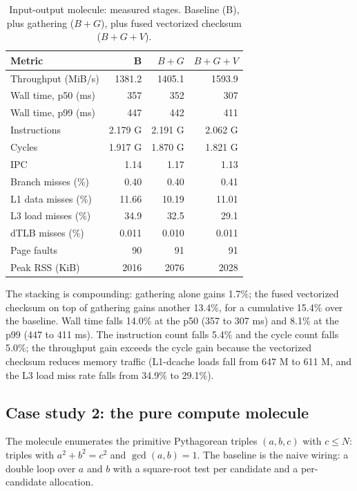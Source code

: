 \begin{table}[t]
\centering
\caption{Input-output molecule: measured stages. Baseline (B), plus
gathering ($B+G$), plus fused vectorized checksum ($B+G+V$).}
\label{tab:demo1}
\begin{tabular}{lrrr}
\toprule
Metric & B & $B+G$ & $B+G+V$\\
\midrule
Throughput (MiB/s) & 1381.2 & 1405.1 & 1593.9\\
Wall time, p50 (ms) & 357 & 352 & 307\\
Wall time, p99 (ms) & 447 & 442 & 411\\
Instructions & 2.179 G & 2.191 G & 2.062 G\\
Cycles & 1.917 G & 1.870 G & 1.821 G\\
IPC & 1.14 & 1.17 & 1.13\\
Branch misses (\%) & 0.40 & 0.40 & 0.41\\
L1 data misses (\%) & 11.66 & 10.19 & 11.01\\
L3 load misses (\%) & 34.9 & 32.5 & 29.1\\
dTLB misses (\%) & 0.011 & 0.010 & 0.011\\
Page faults & 90 & 91 & 91\\
Peak RSS (KiB) & 2016 & 2076 & 2028\\
\bottomrule
\end{tabular}
\end{table}

The stacking is compounding: gathering alone gains 1.7\%; the fused
vectorized checksum on top of gathering gains another 13.4\%, for a
cumulative 15.4\% over the baseline. Wall time falls 14.0\% at the p50
(357 to 307 ms) and 8.1\% at the p99 (447 to 411 ms). The instruction
count falls 5.4\% and the cycle count falls 5.0\%; the throughput gain
exceeds the cycle gain because the vectorized checksum reduces memory
traffic (L1-dcache loads fall from 647 M to 611 M, and the L3 load
miss rate falls from 34.9\% to 29.1\%).

\subsection{Case study 2: the pure compute molecule}

The molecule enumerates the primitive Pythagorean triples
$(a, b, c)$ with $c \leq N$: triples with $a^2 + b^2 = c^2$ and
$\gcd (a, b) = 1$. The baseline is the naive wiring: a double loop
over $a$ and $b$ with a square-root test per candidate and a
per-candidate allocation.

